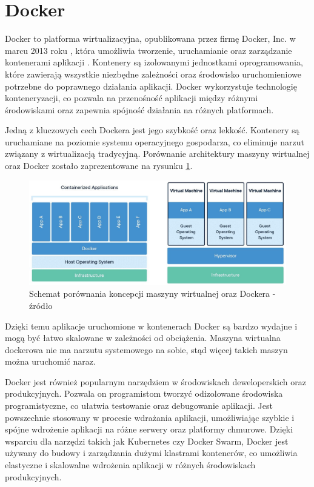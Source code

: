 \section{Docker}

Docker to platforma wirtualizacyjna, opublikowana przez firmę Docker, Inc. w marcu 2013 roku \cite{archiveDotCloudAbout}, która umożliwia tworzenie, uruchamianie oraz zarządzanie kontenerami aplikacji \cite{dockerHome}. 
Kontenery są izolowanymi jednostkami oprogramowania, które zawierają wszystkie niezbędne zależności oraz środowisko uruchomieniowe potrzebne do poprawnego działania aplikacji.
Docker wykorzystuje technologię konteneryzacji, co pozwala na przenośność aplikacji między różnymi środowiskami oraz zapewnia spójność działania na różnych platformach.

Jedną z kluczowych cech Dockera jest jego szybkość oraz lekkość.
Kontenery są uruchamiane na poziomie systemu operacyjnego gospodarza, co eliminuje narzut związany z wirtualizacją tradycyjną.
Porównanie architektury maszyny wirtualnej oraz Docker zostało zaprezentowane na rysunku \ref{rys:docker-vs-vm}.

\begin{figure}[!hb]
	\centering \includegraphics[width=1\linewidth]{rysunki/docker-vs-vm.jpg}
	\caption{Schemat porównania koncepcji maszyny wirtualnej oraz Dockera - źródło \cite{cherryserversOverview}}
	\label{rys:docker-vs-vm}
\end{figure}

Dzięki temu aplikacje uruchomione w kontenerach Docker są bardzo wydajne i mogą być łatwo skalowane w zależności od obciążenia.
Maszyna wirtualna dockerowa nie ma narzutu systemowego na sobie, stąd więcej takich maszyn można uruchomić naraz.

Docker jest również popularnym narzędziem w środowiskach deweloperskich oraz produkcyjnych.
Pozwala on programistom tworzyć odizolowane środowiska programistyczne, co ułatwia testowanie oraz debugowanie aplikacji.
Jest powszechnie stosowany w procesie wdrażania aplikacji, umożliwiając szybkie i spójne wdrożenie aplikacji na różne serwery oraz platformy chmurowe.
Dzięki wsparciu dla narzędzi takich jak Kubernetes czy Docker Swarm, Docker jest używany do budowy i zarządzania dużymi klastrami kontenerów, co umożliwia elastyczne i skalowalne wdrożenia aplikacji w różnych środowiskach produkcyjnych.

